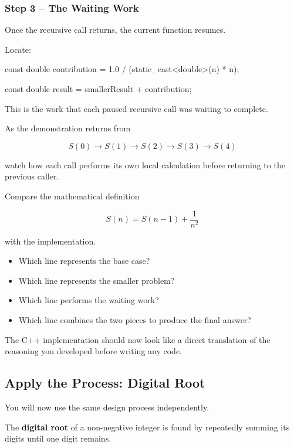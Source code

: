 \documentclass{csc2059practical}
\begin{document}
\subsubsection*{Step 3 -- The Waiting Work}

Once the recursive call returns, the current function resumes.

Locate:

\begin{cppcode}
const double contribution =
    1.0 / (static_cast<double>(n) * n);

const double result =
    smallerResult + contribution;
\end{cppcode}

This is the work that each paused recursive call was waiting to complete.

As the demonstration returns from

\[
S(0)
\rightarrow
S(1)
\rightarrow
S(2)
\rightarrow
S(3)
\rightarrow
S(4)
\]

watch how each call performs its own local calculation before returning to the
previous caller.

\begin{reflectionbox}
Compare the mathematical definition

\[
S(n)=S(n-1)+\frac{1}{n^2}
\]

with the implementation.

\begin{itemize}
    \item Which line represents the base case?
    \item Which line represents the smaller problem?
    \item Which line performs the waiting work?
    \item Which line combines the two pieces to produce the final answer?
\end{itemize}

The C++ implementation should now look like a direct translation of the
reasoning you developed before writing any code.
\end{reflectionbox}

\subsection{Apply the Process: Digital Root}

You will now use the same design process independently.

The \textbf{digital root} of a non-negative integer is found by repeatedly
summing its digits until one digit remains.
\end{document}
